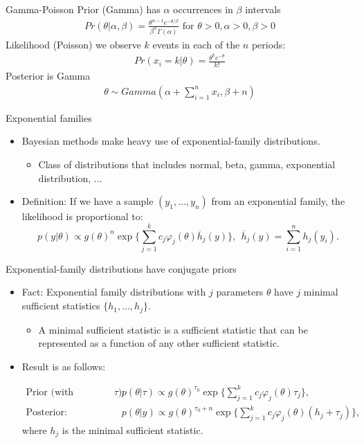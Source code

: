 \documentclass[aspectratio=169]{beamer}
\begin{document}
\begin{frame}{Gamma-Poisson}
Prior (Gamma) has $\alpha$ occurrences in $\beta$ intervals
\begin{align*}
Pr(\theta | \alpha, \beta)=\frac{\theta^{\alpha-1} e^{-\theta / \beta}}{\beta^{\alpha} \Gamma(\alpha)} \text { for } \theta>0, \alpha>0, \beta>0
\end{align*}
Likelihood (Poisson) we observe $k$ events in each of the $n$ periods:
\begin{align*}
Pr(x_i=k | \theta )= \frac{\theta^{k} e^{-\theta}}{k !}
\end{align*}
Posterior is \alert{Gamma}
\begin{align*}
\theta \sim Gamma(\alpha + \sum_{i=1}^n x_i, \beta + n)
\end{align*}
\end{frame}

\begin{frame}{Exponential families}
\begin{itemize}
\item Bayesian methods make heavy use of exponential-family distributions.
\begin{itemize}
\item Class of distributions that includes normal, beta, gamma, exponential
distribution, ...
\end{itemize}
\item Definition: If we have a sample $(y_{1},\ldots,y_{n})$ from an exponential
family, the likelihood is proportional to: 
\[
p(y|\theta)\propto g(\theta)^{n}\exp\{\sum_{j=1}^{k}c_{j}\varphi_{j}(\theta)\overline{h}_{j}(y)\},\ \ \overline{h}_{j}(y)=\sum_{i=1}^{n}h_{j}(y_{i}).
\]
\end{itemize}
\end{frame}
%
\begin{frame}{Exponential-family distributions have conjugate priors}
\begin{itemize}
\item Fact: Exponential family distributions with $j$ parameters $\theta$
have $j$ \alert{minimal sufficient statistics} $\{h_{1},\ldots,h_{j}\}.$
\begin{itemize}
\item A minimal sufficient statistic is a sufficient statistic that can
be represented as a function of any other sufficient statistic.
\end{itemize}
\item Result is as follows:

{\footnotesize{}
\begin{align*}
\text{Prior (with hyperparameters }\tau\text{):\ } & p(\theta|\tau)\propto g(\theta)^{\tau_{0}}\exp\{\sum_{j=1}^{k}c_{j}\varphi_{j}(\theta)\tau_{j}\},\\
\text{Posterior: } & p(\theta|y)\propto g(\theta)^{\tau_{0}+n}\exp\{\sum_{j=1}^{k}c_{j}\varphi_{j}(\theta)\left(h_{j}+\tau_{j}\right)\},
\end{align*}
} where $h_{j}$ is the minimal sufficient statistic.
\end{itemize}
\end{frame}
%
\end{document}
